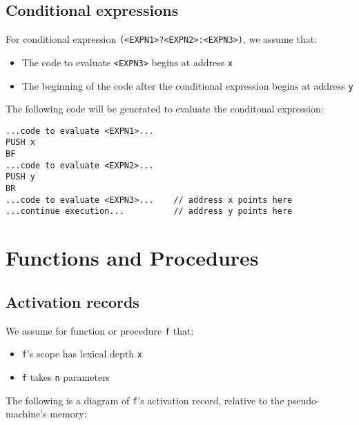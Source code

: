 \documentclass[11pt]{article}
\begin{document}
\subsection{Conditional expressions}

For conditional expression \texttt{(<EXPN1>?<EXPN2>:<EXPN3>)}, we assume that:
\begin{itemize}
    \item The code to evaluate \texttt{<EXPN3>} begins at address \texttt{x}
    \item The beginning of the code after the conditional expression begins at address \texttt{y}
\end{itemize}

The following code will be generated to evaluate the conditonal expression:

\begin{verbatim}
...code to evaluate <EXPN1>...
PUSH x
BF
...code to evaluate <EXPN2>...
PUSH y
BR
...code to evaluate <EXPN3>...    // address x points here
...continue execution...          // address y points here
\end{verbatim}

\section{Functions and Procedures}

\subsection{Activation records}

We assume for function or procedure \texttt{f} that:
    \begin{itemize}
    \item \texttt{f}'s scope has lexical depth \texttt{x}
    \item \texttt{f} takes \texttt{n} parameters
    \end{itemize}

The following is a diagram of \texttt{f}'s activation record, relative to the pseudo-machine's memory:
\end{document}
